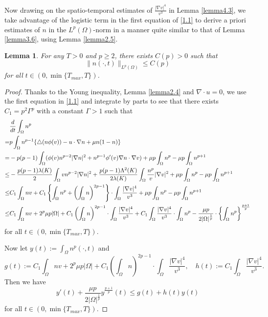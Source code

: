 \documentclass[12pt]{article}
\theoremstyle{plain}
\newtheorem{lemma}{Lemma}[section]
\theoremstyle{definition}
\numberwithin{equation}{section}
\begin{document}
Now drawing on the spatio-temporal estimates of $\frac{|\nabla v|^4}{v^3}$ in Lemma \ref{lemma4.3},
we take advantage of the logistic term in the first equation of \eqref{1.1} to derive a priori estimates of $n$ in the $L^p(\Omega)$-norm in a manner quite similar to
that of Lemma \ref{lemma3.6}, using Lemma \ref{lemma2.5}.

\begin{lemma}\label{lemma4.4} For any $T>0$ and $p \geq  2$, there exists  $C(p)>0$ such that
\begin{equation}\label{4.8}
\|n(\cdot,t)\|_{L^p(\Omega)} \leq C(p)
\end{equation}
for all $t\in (0, \min\{T_{max},T\})$.
\end{lemma}
\begin{proof}Thanks to the Young inequality, Lemma \ref{lemma2.4} and $\nabla\cdot u=0$,
we use the first equation in \eqref{1.1} and integrate by parts  to see that  there exists $C_1=p^2\Gamma^p$
with a constant $\Gamma>1$ such that
\begin{align}\label{4.9}
&\frac d{dt}\int_\Omega n^p\notag\\
=& p\int_\Omega n^{p-1}\{ \triangle(n\phi(v))-u\cdot \nabla n+\mu n(1-n)\}\\
=& -p(p-1) \int_\Omega (\phi(v)n^{p-2}|\nabla n|^2
+ n^{p-1} \phi'(v)\nabla n\cdot \nabla v )+ \mu p \int_\Omega n^p- \mu p \int_\Omega n^{p+1}  \notag\\
\leq & -\frac {p(p-1)\lambda(K)}2 \int_\Omega vn^{p-2}|\nabla n|^2+\frac {p(p-1)\Lambda^2(K)}{2\lambda(K)}
 \int_\Omega \frac{n^p}v |\nabla v|^2+ \mu p \int_\Omega n^p- \mu p \int_\Omega n^{p+1}    \notag\\
 \leq &C_1
 \int_\Omega n v+  C_1 \left\{\int_\Omega n^p+\left(\int_\Omega  n\right)^{2p-1} \right\}
 \cdot  \int_\Omega \frac{|\nabla v|^4}{v^3}+ \mu p \int_\Omega n^p- \mu p \int_\Omega n^{p+1}   \notag\\
 \leq &C_1 \int_\Omega n v+ 2^p\mu p|\Omega|+ C_1 \left(\int_\Omega  n\right)^{2p-1}  \cdot  \int_\Omega \frac{|\nabla v|^4}{v^3}+
  C_1 \int_\Omega \frac{|\nabla v|^4}{v^3}\cdot\int_\Omega n^p-\frac{\mu p}  {2|\Omega|^{\frac1 p}}\cdot\left\{\int_\Omega n^p\right\}^{\frac{p+1}p}   \notag
\end{align}
for all $t\in (0, \min\{T_{max},T\})$.

Now let $y(t):=\int_\Omega n^p(\cdot,t)$ and
$$
g(t):=C_1 \int_\Omega n v+ 2^p\mu p|\Omega|+ C_1 \left(\int_\Omega  n\right)^{2p-1}  \cdot  \int_\Omega \frac{|\nabla v|^4}{v^3},
\quad  h(t):=C_1 \int_\Omega \frac{|\nabla v|^4}{v^3}.
$$
Then we have
\begin{equation}\label{4.10}
y'(t)+ \frac{\mu p}  {2|\Omega|^{\frac1 p}} y^{\frac{p+1}p}(t)\leq g(t)+h(t)y(t)
\end{equation}
for all $t\in (0, \min\{T_{max},T\})$.


\end{proof}
\end{document}
